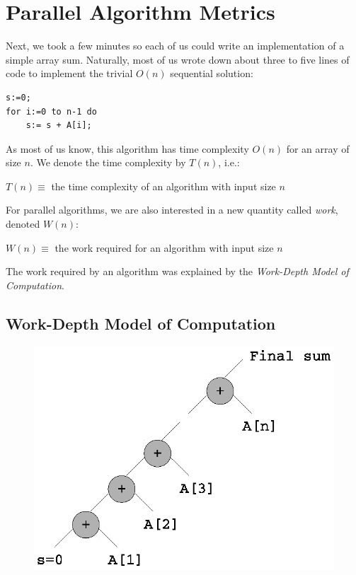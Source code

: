 \documentclass[twoside]{article}
\begin{document}
\section{Parallel Algorithm Metrics}
Next, we took a few minutes so each of us could write an implementation of a simple array sum. Naturally, most of us wrote down about three to five lines of code to implement the trivial $O(n)$ sequential solution:
\begin{lstlisting}
s:=0;
for i:=0 to n-1 do
	s:= s + A[i];
\end{lstlisting}

As most of us know, this algorithm has time complexity $O(n)$ for an array of size $n$. We denote the time complexity by $T(n)$, i.e.:
\begin{center}
$T(n) \equiv$ the time complexity of an algorithm with input size $n$
\end{center}

For parallel algorithms, we are also interested in a new quantity called \textit{work}, denoted $W(n)$:
\begin{center}
$W(n) \equiv$ the work required for an algorithm with input size $n$
\end{center}

The work required by an algorithm was explained by the \textit{Work-Depth Model of Computation}. 
 
 
\subsection{Work-Depth Model of Computation} 
\begin{figure}
\includegraphics[scale=0.7]{img/wd_model_1.eps}
\end{figure}
\end{document}
